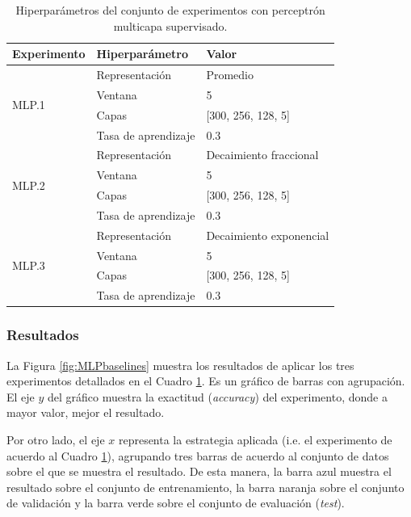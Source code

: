 \begin{table}[h]
    \centering
    \begin{tabular}{|l|l|l|}
        \hline
        \textbf{Experimento} & \textbf{Hiperparámetro} & \textbf{Valor} \\
        \hline
        \multirow{4}{*}{MLP.1} & Representación & Promedio \\
                               & Ventana & 5 \\
                               & Capas & [300, 256, 128, 5] \\
                               & Tasa de aprendizaje & 0.3 \\
        \hline
        \multirow{4}{*}{MLP.2} & Representación & Decaimiento fraccional \\
                               & Ventana & 5 \\
                               & Capas & [300, 256, 128, 5] \\
                               & Tasa de aprendizaje & 0.3 \\
        \hline
        \multirow{4}{*}{MLP.3} & Representación & Decaimiento exponencial \\
                               & Ventana & 5 \\
                               & Capas & [300, 256, 128, 5] \\
                               & Tasa de aprendizaje & 0.3 \\
        \hline
    \end{tabular}
    \caption{Hiperparámetros del conjunto de experimentos con perceptrón multicapa supervisado.}
    \label{tab:exp:perceptron}
\end{table}

\subsubsection{Resultados}

La Figura \ref{fig:MLPbaselines} muestra los resultados de aplicar los tres experimentos detallados en el
Cuadro \ref{tab:exp:perceptron}. Es un gráfico de barras con agrupación. El eje $y$ del gráfico muestra la
exactitud ({\em accuracy}) del experimento, donde a mayor valor, mejor el resultado. 

Por otro lado, el eje $x$ representa la estrategia aplicada (i.e. el experimento de acuerdo al Cuadro 
\ref{tab:exp:perceptron}), agrupando tres barras de acuerdo al conjunto de datos sobre el que se muestra el 
resultado. De esta manera, la barra azul muestra el resultado sobre el conjunto de entrenamiento, la barra 
naranja sobre el conjunto de validación y la barra verde sobre el conjunto de evaluación ({\em test}).

